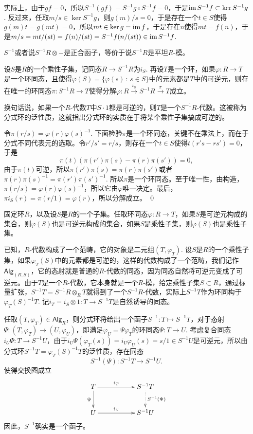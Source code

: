 实际上，由于$gf=0$，所以$S^{-1}(gf)=S^{-1}g\circ S^{-1}f=0$，于是$\operatorname{im} S^{-1}f\subset \ker S^{-1}g$. 反过来，任取$m/s\in \ker S^{-1}g$，则$g(m)/s=0$，于是存在一个$t\in S$使得$g(m)t=g(mt)=0$，所以$mt\in \ker g=\operatorname{im} f$，于是存在$n$使得$mt=f(n)$，于是$m/s=mt/(st)=f(n)/(st)=S^{-1}f(n/(st))\in \operatorname{im} S^{-1}f$.

\pro $S^{-1}$或者说$S^{-1}R\otimes -$是正合函子，等价于说$S^{-1}R$是平坦$R$-模。

\pro 设$S$是$R$的一个乘性子集，记同态$R\to S^{-1}R$为$i_S$. 再设$T$是一个环，如果$\varphi:R\to T$是一个环同态，且使得$\varphi(S)=\{\varphi(s)\,:\, s\in S\}$中的元素都是$T$中的可逆元，则存在唯一的环同态$\pi:S^{-1}R\to T$使得分解$\varphi:R\xrightarrow{i_S}S^{-1}R\xrightarrow{\pi} T$成立。

换句话说，如果一个$R$-代数$T$中$S\cdot 1$都是可逆的，则$T$是一个$S^{-1}R$-代数。这被称为分式环的泛性质，这就指出分式环的实质在于将某个乘性子集搞成可逆的。

\proof
	令$\pi(r/s)=\varphi(r)\varphi(s)^{-1}$. 下面检验$\pi$是一个环同态，关键不在乘法上，而在于分式不同代表元的选取。令$r'/s'=r/s$，则存在一个$t\in S$使得$t(r's-rs')=0$，于是
	\[
		\pi(t)(\pi(r')\pi(s)-\pi(r)\pi(s'))=0,
	\]
	由于$\pi(t)$可逆，所以$\pi(r')\pi(s)=\pi(r)\pi(s')$或者$\pi(r)\pi(s)^{-1}=\pi(r')\pi(s')^{-1}$. 所以$\pi$是一个环同态。至于唯一性，由构造，$\pi(r/s)=\varphi(r)\varphi(s)^{-1}$，所以它由$\varphi$唯一决定。最后，$\pi i_S(r)=\pi(r/1)=\varphi(r)$，所以分解成立。
\qed

\para 固定环$R$，以及设$S$是$R$的一个子集。任取环同态$\varphi:R\to T$，如果$S$是可逆元构成的集合，则$\varphi(S)$也是可逆元构成的集合，如果$S$是乘性子集，则$\varphi(S)$也是乘性子集。

已知，$R$-代数构成了一个范畴，它的对象是二元组$(T,\varphi_T)$. 设$S$是$R$的一个乘性子集，如果$\varphi_T(S)$中的元素都是可逆的，这样的代数构成了一个范畴，我们记作$\mathsf{Alg}_{(R,S)}$，它的态射就是普通的$R$-代数的同态，因为同态自然将可逆元变成了可逆元。由于$T$是一个$R$-代数，它本身就是一个$R$-模，给定乘性子集$S\subset R$，通过标量扩张，$S^{-1}T=S^{-1}R\otimes_R T$就得到了一个$S^{-1}R$-代数，实际上$S^{-1}T$作为环同构于$\varphi_T(S)^{-1}T$. 记$i_T=i_S\otimes 1:T\to S^{-1}T$是自然诱导的同态。

任取$(T,\varphi_T)\in \mathsf{Alg}_R$，则分式环将给出一个函子$S^{-1}:T\mapsto S^{-1}T$，对于态射$\Psi:(T,\varphi_T)\to (U,\varphi_U)$，即满足$\varphi_U=\Psi\varphi_T$的环同态$\Psi:T\to U$. 考虑复合同态$i_{U}\Psi:T\to S^{-1}U$，由于$i_{U}\Psi(\varphi_T(s))=i_{U}\varphi_U(s)=s/1\in S^{-1}U$是可逆元，所以由分式环$S^{-1}T=\varphi_T(S)^{-1}T$的泛性质，存在同态
\[
	S^{-1}(\Psi):S^{-1}T\to S^{-1}U.
\]
使得交换图成立
\[
\begin{xy}
	\xymatrix{
		T\ar[rr]^-{i_T} \ar[d]_-{\Psi}&&S^{-1}T \ar@{.>}[d]^-{S^{-1}(\Psi)}\\
		U\ar[rr]^-{i_U} &&S^{-1}U
	}
\end{xy}
\]
因此，$S^{-1}$确实是一个函子。

